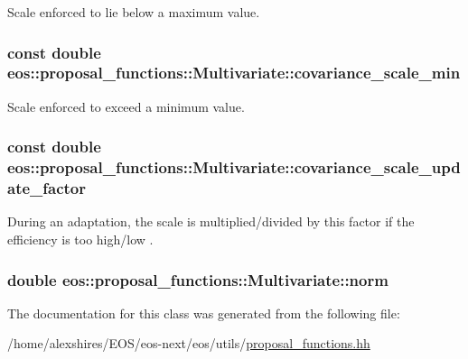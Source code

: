 Scale enforced to lie below a maximum value. \hypertarget{classeos_1_1proposal__functions_1_1Multivariate_afd2de46a2288413f8e06c1f197b71ec2}{
\subsubsection[{covariance\_\-scale\_\-min}]{\setlength{\rightskip}{0pt plus 5cm}const double {\bf eos::proposal\_\-functions::Multivariate::covariance\_\-scale\_\-min}}}
\label{classeos_1_1proposal__functions_1_1Multivariate_afd2de46a2288413f8e06c1f197b71ec2}


Scale enforced to exceed a minimum value. \hypertarget{classeos_1_1proposal__functions_1_1Multivariate_a69c7f79624af473004a147598d9afaa1}{
\subsubsection[{covariance\_\-scale\_\-update\_\-factor}]{\setlength{\rightskip}{0pt plus 5cm}const double {\bf eos::proposal\_\-functions::Multivariate::covariance\_\-scale\_\-update\_\-factor}}}
\label{classeos_1_1proposal__functions_1_1Multivariate_a69c7f79624af473004a147598d9afaa1}
During an adaptation, the scale is multiplied/divided by this factor if the efficiency is too high/low . \hypertarget{classeos_1_1proposal__functions_1_1Multivariate_a6ca72be11badd000f8d36a80c131b5d4}{
\subsubsection[{norm}]{\setlength{\rightskip}{0pt plus 5cm}double {\bf eos::proposal\_\-functions::Multivariate::norm}}}
\label{classeos_1_1proposal__functions_1_1Multivariate_a6ca72be11badd000f8d36a80c131b5d4}


The documentation for this class was generated from the following file:\begin{DoxyCompactItemize}
\item 
/home/alexshires/EOS/eos-\/next/eos/utils/\hyperlink{proposal__functions_8hh}{proposal\_\-functions.hh}\end{DoxyCompactItemize}
